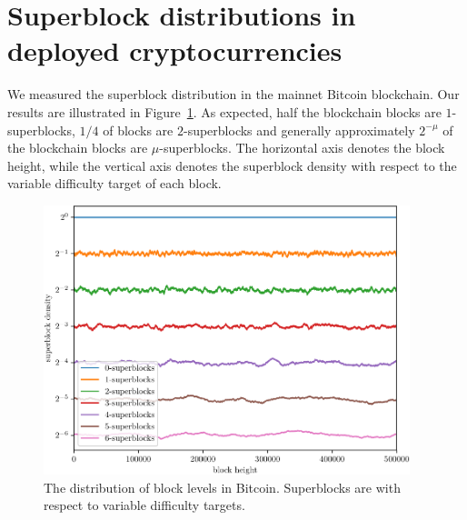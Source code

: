 \section{Superblock distributions in deployed cryptocurrencies}

We measured the superblock distribution in the mainnet Bitcoin blockchain. Our
results are illustrated in Figure~\ref{fig.btc-superblocks}. As expected,
half the blockchain blocks are $1$-superblocks, $1/4$ of blocks are
$2$-superblocks and generally approximately $2^{-\mu}$ of the blockchain blocks
are $\mu$-superblocks. The horizontal axis denotes the block height, while the
vertical axis denotes the superblock density with respect to the variable
difficulty target of each block.

\begin{figure}[h]
\begin{center}
  \includegraphics[width=0.95\textwidth]{figures/bitcoin-superblock-distribution.pdf}
  \caption{The distribution of block levels in Bitcoin. Superblocks are with
    respect to variable difficulty targets.}
  \label{fig.btc-superblocks}
  \end{center}
\end{figure}
